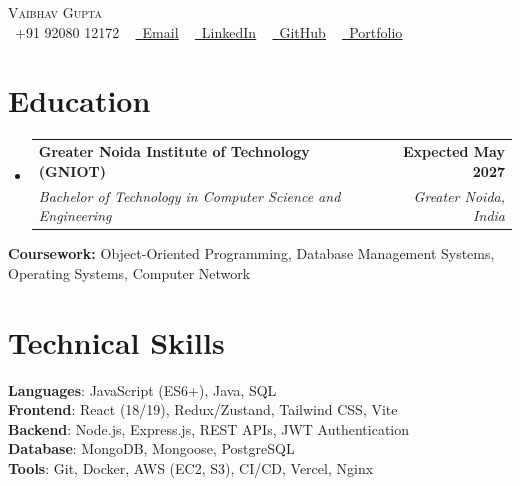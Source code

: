 \documentclass[letterpaper,10pt]{article}
\makeatletter
\newcommand{\resumeSubheading}[4]{
  \vspace{-2pt}\item
    \begin{tabular*}{1.0\textwidth}[t]{l@{\extracolsep{\fill}}r}
      \textbf{#1} & \textbf{\small #2} \\
      \textit{\small#3} & \textit{\small #4} \\
    \end{tabular*}\vspace{-7pt}
}
\newcommand{\resumeSubHeadingListStart}{\begin{itemize}[leftmargin=0.0in, label={}]}
\newcommand{\resumeSubHeadingListEnd}{\end{itemize}}
\makeatother
\begin{document}

\begin{center}
    {\Huge \scshape Vaibhav Gupta} \\ \vspace{1pt}
    \small \raisebox{-0.1\height}\faPhone\ +91 92080 12172 ~
    \href{mailto:vaibhv19.business@gmail.com}{\raisebox{-0.2\height}\faEnvelope\ \underline{Email}} ~
    \href{https://linkedin.com/in/vaibhv19}{\raisebox{-0.2\height}\faLinkedin\ \underline{LinkedIn}} ~
    \href{https://github.com/vaibhv19}{\raisebox{-0.2\height}\faGithub\ \underline{GitHub}} ~
    \href{https://vaibhv19.dev}{\raisebox{-0.2\height}\faGlobe\ \underline{Portfolio}}
    \vspace{-8pt}
\end{center}

\section{Education}
  \resumeSubHeadingListStart
    \resumeSubheading
      {Greater Noida Institute of Technology (GNIOT)}{Expected May 2027}
      {Bachelor of Technology in Computer Science and Engineering}{Greater Noida, India}
  \resumeSubHeadingListEnd
  \vspace{-4pt}
  \begin{itemize}[leftmargin=0in, label={}]
    \small{\item{\textbf{Coursework:} Object-Oriented Programming, Database Management Systems, Operating Systems, Computer Network}}
    \vspace{-10pt}
\end{itemize}

\section{Technical Skills}
 \begin{itemize}[leftmargin=0in, label={}]
    \small{\item{
     \textbf{Languages}{: JavaScript (ES6+), Java, SQL} \\
     \textbf{Frontend}{: React (18/19), Redux/Zustand, Tailwind CSS, Vite} \\
     \textbf{Backend}{: Node.js, Express.js, REST APIs, JWT Authentication} \\
     \textbf{Database}{: MongoDB, Mongoose, PostgreSQL} \\
     \textbf{Tools}{: Git, Docker, AWS (EC2, S3), CI/CD, Vercel, Nginx} \\
    }}
 \end{itemize}
 \vspace{-12pt}
\end{document}
